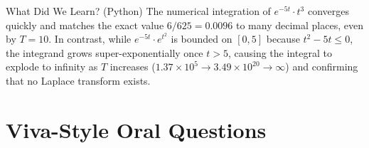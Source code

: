 \documentclass[12pt,a4paper]{article}
\begin{document}
\begin{learnbox}{What Did We Learn? (Python)}
The numerical integration of $e^{-5t} \cdot t^3$ converges quickly and matches the exact
value $6/625 = 0.0096$ to many decimal places, even by $T = 10$.
In contrast, while $e^{-5t} \cdot e^{t^2}$ is bounded on $[0, 5]$ because $t^2 - 5t \le 0$,
the integrand grows super-exponentially once $t > 5$, causing the integral to explode to
infinity as $T$ increases ($1.37 \times 10^5 \to 3.49 \times 10^{20} \to \infty$) and
confirming that no Laplace transform exists.
\end{learnbox}

\section{Viva-Style Oral Questions}
\end{document}
